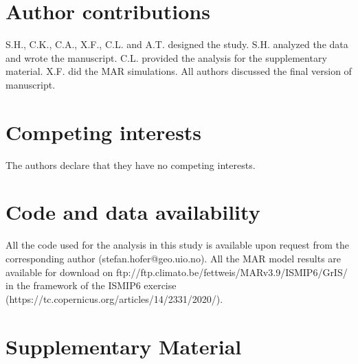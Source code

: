 \documentclass[12pt]{article}
\begin{document}
\section*{Author contributions}

S.H., C.K., C.A., X.F., C.L. and A.T. designed the study. S.H. analyzed the data and wrote the manuscript. C.L. provided the analysis for the supplementary material. X.F. did the MAR simulations. All authors discussed the final version of manuscript.

\section*{Competing interests}
The authors declare that they have no competing interests.

\section*{Code and data availability}

%
All the code used for the analysis in this study is available upon request from the corresponding author (stefan.hofer@geo.uio.no). All the MAR model results are available for download on ftp://ftp.climato.be/fettweis/MARv3.9/ISMIP6/GrIS/ in the framework of the ISMIP6 exercise (https://tc.copernicus.org/articles/14/2331/2020/).


\section*{Supplementary Material}
\end{document}
